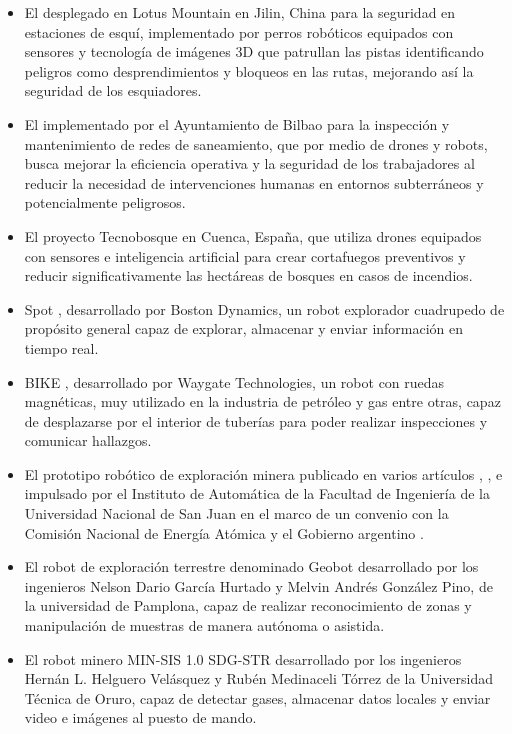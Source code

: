 \begin{itemize}
	\item El desplegado en Lotus Mountain \cite{iot_usecase_seg_china} en Jilin, China para la seguridad en estaciones de esquí, implementado por perros robóticos equipados con sensores y tecnología de imágenes 3D que patrullan las pistas identificando peligros como desprendimientos y bloqueos en las rutas, mejorando así la seguridad de los esquiadores.

	\item El implementado por el Ayuntamiento de Bilbao \cite{iot_usecase_bilbao} para la inspección y mantenimiento de redes de saneamiento, que por medio de drones y robots, busca mejorar la eficiencia operativa y la seguridad de los trabajadores al reducir la necesidad de intervenciones humanas en entornos subterráneos y potencialmente peligrosos.

	\item El proyecto Tecnobosque \cite{iot_usecase_cuenca} en Cuenca, España, que utiliza drones equipados con sensores e inteligencia artificial para crear cortafuegos preventivos y reducir significativamente las hectáreas de bosques en casos de incendios. 


	\item Spot \cite{spot}, desarrollado por Boston Dynamics, un robot explorador cuadrupedo de propósito general capaz de explorar, almacenar y enviar información en tiempo real.
	  
	\item BIKE \cite{bike_inspection}, desarrollado por Waygate Technologies, un robot con ruedas magnéticas, muy utilizado en la industria de petróleo y gas entre otras, capaz de desplazarse por el interior de tuberías para poder realizar inspecciones y comunicar hallazgos.

	\item El prototipo robótico de exploración minera publicado en varios artículos \cite{latam-mining-robot-minero-unsj}, \cite{diario-de-cuyo-prototipo-robotico}, e impulsado por el Instituto de Automática de la Facultad de Ingeniería de la Universidad Nacional de San Juan en el marco de un convenio con la Comisión Nacional de Energía Atómica y el Gobierno argentino \cite{comunicacion-unsj-prototipo-convenio}.

	\item El robot de exploración terrestre denominado Geobot \cite{geobot} desarrollado por los ingenieros Nelson Dario García Hurtado y Melvin Andrés González Pino, de la universidad de Pamplona, capaz de realizar reconocimiento de zonas y manipulación de muestras de manera autónoma o asistida.

	\item El robot minero MIN-SIS 1.0 SDG-STR \cite{min-sis} desarrollado por los ingenieros Hernán L. Helguero Velásquez y Rubén Medinaceli Tórrez de la Universidad Técnica de Oruro, capaz de detectar gases, almacenar datos locales y enviar video e imágenes al puesto de mando.


\end{itemize}


